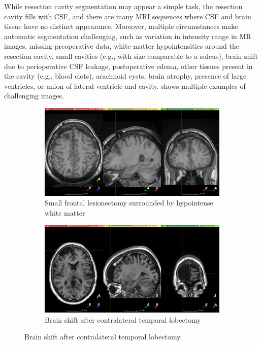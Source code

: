 While resection cavity segmentation may appear a simple task, the resection cavity fills with \ac{CSF}, and there are many \ac{MRI} sequences where \ac{CSF} and brain tissue have no distinct appearance.
Moreover, multiple circumstances make automatic segmentation challenging, such as
variation in intensity range in MR images,
missing preoperative data,
white-matter hypointensities around the resection cavity,
small cavities (e.g., with size comparable to a sulcus),
brain shift due to perioperative \ac{CSF} leakage,
postoperative edema,
other tissues present in the cavity (e.g., blood clots),
arachnoid cysts,
brain atrophy,
presence of large ventricles, or
union of lateral ventricle and cavity.
 shows multiple examples of challenging images.

\begin{figure}

  \begin{subfigure}{0.49\textwidth}
    \centering
    \includegraphics[width=\linewidth]{figures/hard_0}
    \caption{Small frontal lesionectomy surrounded by hypointense white matter}
    \label{fig:hard_sub_0}
  \end{subfigure}
  \hfill
  \begin{subfigure}{0.49\textwidth}
    \centering
    \includegraphics[width=\linewidth]{figures/hard_1}
    \caption{Brain shift after contralateral temporal lobectomy}
    \label{fig:hard_sub_1}
  \end{subfigure}


\end{figure}
